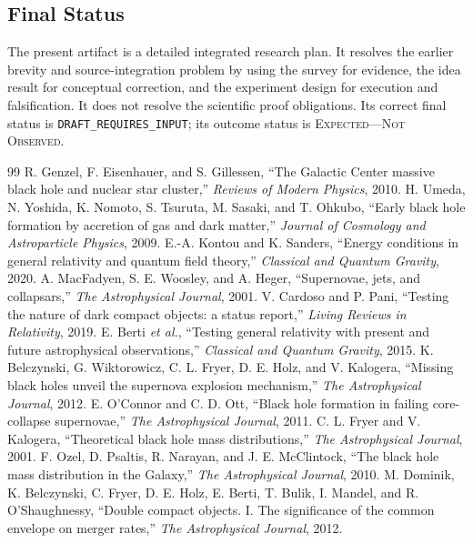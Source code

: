 \documentclass[conference]{IEEEtran}
\newcommand{\Expected}{\textsc{Expected---Not Observed}}
\begin{document}
\subsection{Final Status}
The present artifact is a detailed integrated research plan. It resolves the earlier brevity and source-integration problem by using the survey for evidence, the idea result for conceptual correction, and the experiment design for execution and falsification. It does not resolve the scientific proof obligations. Its correct final status is \texttt{DRAFT\_REQUIRES\_INPUT}; its outcome status is \Expected.

\begin{thebibliography}{99}
 R. Genzel, F. Eisenhauer, and S. Gillessen, ``The Galactic Center massive black hole and nuclear star cluster,'' \emph{Reviews of Modern Physics}, 2010.
 H. Umeda, N. Yoshida, K. Nomoto, S. Tsuruta, M. Sasaki, and T. Ohkubo, ``Early black hole formation by accretion of gas and dark matter,'' \emph{Journal of Cosmology and Astroparticle Physics}, 2009.
 E.-A. Kontou and K. Sanders, ``Energy conditions in general relativity and quantum field theory,'' \emph{Classical and Quantum Gravity}, 2020.
 A. MacFadyen, S. E. Woosley, and A. Heger, ``Supernovae, jets, and collapsars,'' \emph{The Astrophysical Journal}, 2001.
 V. Cardoso and P. Pani, ``Testing the nature of dark compact objects: a status report,'' \emph{Living Reviews in Relativity}, 2019.
 E. Berti \emph{et al.}, ``Testing general relativity with present and future astrophysical observations,'' \emph{Classical and Quantum Gravity}, 2015.
 K. Belczynski, G. Wiktorowicz, C. L. Fryer, D. E. Holz, and V. Kalogera, ``Missing black holes unveil the supernova explosion mechanism,'' \emph{The Astrophysical Journal}, 2012.
 E. O'Connor and C. D. Ott, ``Black hole formation in failing core-collapse supernovae,'' \emph{The Astrophysical Journal}, 2011.
 C. L. Fryer and V. Kalogera, ``Theoretical black hole mass distributions,'' \emph{The Astrophysical Journal}, 2001.
 F. Ozel, D. Psaltis, R. Narayan, and J. E. McClintock, ``The black hole mass distribution in the Galaxy,'' \emph{The Astrophysical Journal}, 2010.
 M. Dominik, K. Belczynski, C. Fryer, D. E. Holz, E. Berti, T. Bulik, I. Mandel, and R. O'Shaughnessy, ``Double compact objects. I. The significance of the common envelope on merger rates,'' \emph{The Astrophysical Journal}, 2012.

\end{thebibliography}
\end{document}
